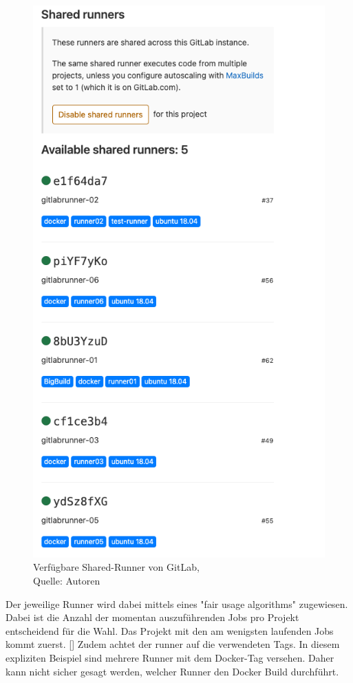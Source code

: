 \begin{figure}[H]
	\centering
	\includegraphics[scale=0.5]{images/gitLabRunner.png}
	\caption[Verfügbare Shared-Runner von GitLab]{Verfügbare Shared-Runner von GitLab,\\ Quelle: Autoren}
	\label{img: runnerGitlab}
\end{figure}
Der jeweilige Runner wird dabei mittels eines "fair usage algorithms" zugewiesen. Dabei ist die Anzahl der momentan auszuführenden Jobs pro Projekt entscheidend für die Wahl. Das Projekt mit den am wenigsten laufenden Jobs kommt zuerst. [\cite{runnersGitlab}] Zudem achtet der runner auf die verwendeten Tags. In diesem expliziten Beispiel sind mehrere Runner mit dem Docker-Tag versehen. Daher kann nicht sicher gesagt werden, welcher Runner den Docker Build durchführt. 
